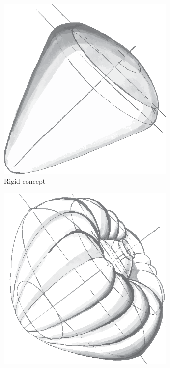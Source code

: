 \begin{figure}[h]
	\centering
	\begin{subfigure}[b]{0.32\textwidth}
		\includegraphics[angle=180, width=0.96\textwidth]{./Figure/Concepts/rigid.eps}
		\caption{Rigid concept}
		\label{fig:rigid}
	\end{subfigure}
	\begin{subfigure}[b]{0.32\textwidth}
		\includegraphics[width=0.96\textwidth]{./Figure/Concepts/isotensoid.eps}

\end{subfigure}
\end{figure}

